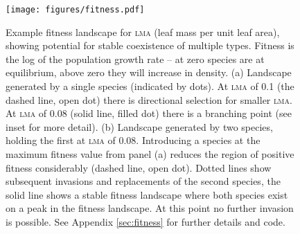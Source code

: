 \documentclass[a4paper,11pt]{article}
\begin{document}
\begin{figure}[h!]
\centering
\texttt{[image: figures/fitness.pdf]}
\caption{Example fitness landscape for \textsc{lma} (leaf mass per
  unit leaf area), showing potential for stable coexistence of
  multiple types.  Fitness is the log of the population growth rate --
  at zero species are at equilibrium, above zero they will increase in
  density.  (a) Landscape generated by a single species (indicated by
  dots).  At \textsc{lma} of 0.1 (the dashed line, open dot) there is
  directional selection for smaller \textsc{lma}.  At \textsc{lma} of
  0.08 (solid line, filled dot) there is a branching point (see inset
  for more detail).  (b) Landscape generated by two species, holding
  the first at \textsc{lma} of 0.08.  Introducing a species at the
  maximum fitness value from panel (a) reduces the region of positive
  fitness considerably (dashed line, open dot).  Dotted lines show
  subsequent invasions and replacements of the second species, the
  solid line shows a stable fitness landscape where both species exist
  on a peak in the fitness landscape.  At this point no further
  invasion is possible.  See Appendix \ref{sec:fitness} for further
  details and code.}
\label{fig:fitness}
\end{figure}

\clearpage
\setcounter{secnumdepth}{1}
\end{document}
